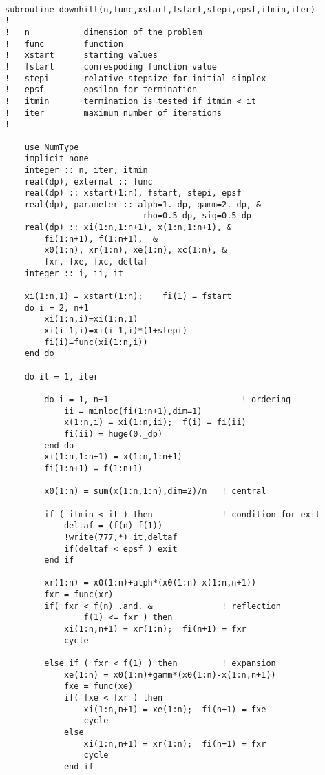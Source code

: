\documentclass[12pt]{article}
\begin{document}
\begin{lstlisting}[frame=single,caption={{\tt downhill-p.f90}},label=downhill-p2]

subroutine downhill(n,func,xstart,fstart,stepi,epsf,itmin,iter)
!
!   n           dimension of the problem
!   func        function
!   xstart      starting values
!   fstart      conrespoding function value
!   stepi       relative stepsize for initial simplex
!   epsf        epsilon for termination
!   itmin       termination is tested if itmin < it
!   iter        maximum number of iterations
!

    use NumType
    implicit none
    integer :: n, iter, itmin
    real(dp), external :: func
    real(dp) :: xstart(1:n), fstart, stepi, epsf
    real(dp), parameter :: alph=1._dp, gamm=2._dp, &
                            rho=0.5_dp, sig=0.5_dp
    real(dp) :: xi(1:n,1:n+1), x(1:n,1:n+1), &
        fi(1:n+1), f(1:n+1),  &
        x0(1:n), xr(1:n), xe(1:n), xc(1:n), &
        fxr, fxe, fxc, deltaf
    integer :: i, ii, it
    
    xi(1:n,1) = xstart(1:n);    fi(1) = fstart
    do i = 2, n+1
        xi(1:n,i)=xi(1:n,1)
        xi(i-1,i)=xi(i-1,i)*(1+stepi)
        fi(i)=func(xi(1:n,i))
    end do
       
    do it = 1, iter 
        
        do i = 1, n+1                           ! ordering
            ii = minloc(fi(1:n+1),dim=1)
            x(1:n,i) = xi(1:n,ii);  f(i) = fi(ii)
            fi(ii) = huge(0._dp)
        end do
        xi(1:n,1:n+1) = x(1:n,1:n+1)
        fi(1:n+1) = f(1:n+1)
                
        x0(1:n) = sum(x(1:n,1:n),dim=2)/n   ! central
        
        if ( itmin < it ) then              ! condition for exit
            deltaf = (f(n)-f(1))
            !write(777,*) it,deltaf
            if(deltaf < epsf ) exit
        end if
                
        xr(1:n) = x0(1:n)+alph*(x0(1:n)-x(1:n,n+1))
        fxr = func(xr)
        if( fxr < f(n) .and. &              ! reflection
                f(1) <= fxr ) then 
            xi(1:n,n+1) = xr(1:n);  fi(n+1) = fxr
            cycle
        
        else if ( fxr < f(1) ) then         ! expansion
            xe(1:n) = x0(1:n)+gamm*(x0(1:n)-x(1:n,n+1))
            fxe = func(xe)
            if( fxe < fxr ) then
                xi(1:n,n+1) = xe(1:n);  fi(n+1) = fxe
                cycle
            else
                xi(1:n,n+1) = xr(1:n);  fi(n+1) = fxr
                cycle
            end if


\end{lstlisting}
\end{document}

